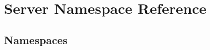 \hypertarget{namespace_server}{}\section{Server Namespace Reference}
\label{namespace_server}
\subsection*{Namespaces}
\begin{DoxyCompactItemize}
\end{DoxyCompactItemize}
